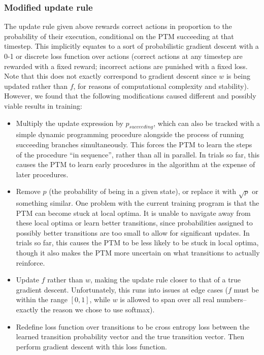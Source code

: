 \documentclass{article}
\begin{document}
\subsubsection{Modified update rule}
The update rule given above rewards correct actions in proportion to the probability of their execution, conditional on the PTM succeeding at that timestep. This implicitly equates to a sort of probabilistic gradient descent with a 0-1 or discrete loss function over actions (correct actions at any timestep are rewarded with a fixed reward; incorrect actions are punished with a fixed loss. Note that this does not exactly correspond to gradient descent since $w$ is being updated rather than $f$, for reasons of computational complexity and stability). However, we found that the following modifications caused different and possibly viable results in training:
\begin{itemize}
    \item Multiply the update expression by $p_{succeeding}$, which can also be tracked with a simple dynamic programming procedure alongside the process of running succeeding branches simultaneously. This forces the PTM to learn the steps of the procedure ``in sequence'', rather than all in parallel. In trials so far, this causes the PTM to learn early procedures in the algorithm at the expense of later procedures.
    \item Remove $p$ (the probability of being in a given state), or replace it with $\sqrt{p}$ or something similar. One problem with the current training program is that the PTM can become stuck at local optima. It is unable to navigate away from these local optima or learn better transitions, since probabilities assigned to possibly better transitions are too small to allow for significant updates. In trials so far, this causes the PTM to be less likely to be stuck in local optima, though it also makes the PTM more uncertain on what transitions to actually reinforce.
    \item Update $f$ rather than $w$, making the update rule closer to that of a true gradient descent. Unfortunately, this runs into issues at edge cases ($f$ must be within the range $[0,1]$, while $w$ is allowed to span over all real numbers--exactly the reason we chose to use softmax). 
    \item Redefine loss function over transitions to be cross entropy loss between the learned transition probability vector and the true transition vector. Then perform gradient descent with this loss function. 
\end{itemize}
\end{document}
